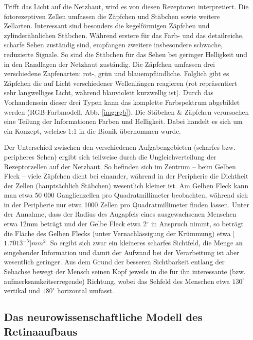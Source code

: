 \documentclass[12pt,a4paper]{article}
\newcommand{\fig}[1]{Abb. #1}
\begin{document}
Trifft das Licht auf die Netzhaut, wird es von diesen Rezeptoren interpretiert.
Die fotorezeptiven Zellen umfassen die Zäpfchen und Stäbchen sowie weitere
Zellarten. Interessant sind besonders die kegelförmigen Zäpfchen und
zylinderähnlichen Stäbchen. Während erstere für das Farb- und das detailreiche,
scharfe Sehen zuständig sind, empfangen zweitere insbesondere schwache,
reduzierte Signale. So sind die Stäbchen für das Sehen bei geringer Helligkeit
und in den Randlagen der Netzhaut zuständig. Die Zäpfchen umfassen drei
verschiedene Zapfenarten: rot-, grün und blauempflindliche. Folglich gibt es
Zäpfchen die auf Licht verschiedener Wellenlängen reagieren (rot
repräsentiert sehr langwelliges Licht, während blauviolett kurzwellig
ist). Durch das Vorhandensein dieser drei Typen kann das komplette Farbspektrum
abgebildet werden (RGB-Farbmodell, \fig{\ref{img:rgb}}). Die Stäbchen \&
Zäpfchen verursachen eine Teilung der Informationen Farben und Helligkeit.
Dabei handelt es sich um ein Konzept, welches 1:1 in die Bionik übernommen
wurde.

Der Unterschied zwischen den verschiedenen Aufgabengebieten (scharfes bzw.
peripheres Sehen) ergibt sich teilweise durch die Ungleichverteilung der
Rezeptorzellen auf der Netzhaut. So befinden sich im Zentrum -- beim Gelben
Fleck -- viele Zäpfchen dicht bei einander, während in der Peripherie die
Dichtheit der Zellen (hauptsächlich Stäbchen) wesentlich kleiner ist.
Am Gelben Fleck kann man etwa 50 000 Ganglienzellen pro Quadratmillimeter
beobachten, während sich in der Peripherie nur etwa 1000 Zellen pro
Quadratmillimeter finden lassen. Unter der Annahme, dass der Radius des
Augapfels eines ausgewachsenen Menschen etwa 12mm beträgt und der Gelbe
Fleck etwa 2$^\circ$ in Anspruch nimmt, so beträgt die Fläche des Gelben
Flecks (unter Vernachlässigung der Krümmung) etwa \unit[$1.7013^{-5}$]{$mm^2$}.
So ergibt sich zwar ein kleineres scharfes Sichtfeld, die Menge an eingehender
Information und damit der Aufwand bei der Verarbeitung ist aber wesentlich
geringer. Aus dem Grund der besseren Sichtbarkeit entlang der Sehachse bewegt
der Mensch seinen Kopf jeweils in die für ihn interessante (bzw.
aufmerksamkeitserregende) Richtung, wobei das Sehfeld des Menschen etwa
$130^\circ$ vertikal und $180^\circ$ horizontal umfasst.

\subsection{Das neurowissenschaftliche Modell des Retinaaufbaus}
\end{document}
